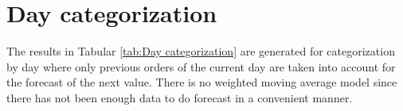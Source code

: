 \section{Day categorization}\label{section:Day categorization}
The results in Tabular \ref{tab:Day categorization} are generated for categorization by day where only previous orders of the current day are taken into account for the forecast of the next value. There is no weighted moving average model since there has not been enough data to do forecast in a convenient manner.
\begin{table}[h]
\centering
\caption{Day categorization results}
\label{tab:Day categorization}
\end{table}
